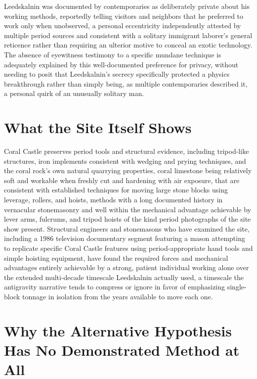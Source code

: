 \documentclass[11pt]{article}
\begin{document}
Leedskalnin was documented by contemporaries as deliberately private about his working methods, reportedly telling visitors and neighbors that he preferred to work only when unobserved, a personal eccentricity independently attested by multiple period sources and consistent with a solitary immigrant laborer's general reticence rather than requiring an ulterior motive to conceal an exotic technology. The absence of eyewitness testimony to a specific mundane technique is adequately explained by this well-documented preference for privacy, without needing to posit that Leedskalnin's secrecy specifically protected a physics breakthrough rather than simply being, as multiple contemporaries described it, a personal quirk of an unusually solitary man.

\section{What the Site Itself Shows}

Coral Castle preserves period tools and structural evidence, including tripod-like structures, iron implements consistent with wedging and prying techniques, and the coral rock's own natural quarrying properties, coral limestone being relatively soft and workable when freshly cut and hardening with air exposure, that are consistent with established techniques for moving large stone blocks using leverage, rollers, and hoists, methods with a long documented history in vernacular stonemasonry and well within the mechanical advantage achievable by lever arms, fulcrums, and tripod hoists of the kind period photographs of the site show present. Structural engineers and stonemasons who have examined the site, including a 1986 television documentary segment featuring a mason attempting to replicate specific Coral Castle features using period-appropriate hand tools and simple hoisting equipment, have found the required forces and mechanical advantages entirely achievable by a strong, patient individual working alone over the extended multi-decade timescale Leedskalnin actually used, a timescale the antigravity narrative tends to compress or ignore in favor of emphasizing single-block tonnage in isolation from the years available to move each one.

\section{Why the Alternative Hypothesis Has No Demonstrated Method at All}
\end{document}
